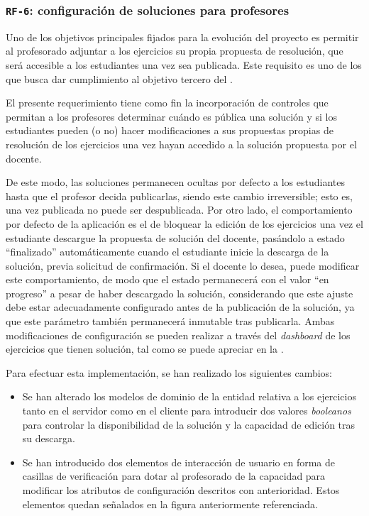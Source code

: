 \subsubsection{\texttt{RF-6}: configuración de soluciones para profesores}
\label{subsec:rf6}

Uno de los objetivos principales fijados para la evolución del proyecto es permitir al profesorado adjuntar a los ejercicios su propia propuesta de resolución, que será accesible a los estudiantes una vez sea publicada. Este requisito es uno de los que busca dar cumplimiento al objetivo tercero del .

El presente requerimiento tiene como fin la incorporación de controles que permitan a los profesores determinar cuándo es pública una solución y si los estudiantes pueden (o no) hacer modificaciones a sus propuestas propias de resolución de los ejercicios una vez hayan accedido a la solución propuesta por el docente.

De este modo, las soluciones permanecen ocultas por defecto a los estudiantes hasta que el profesor decida publicarlas, siendo este cambio irreversible; esto es, una vez publicada no puede ser despublicada. Por otro lado, el comportamiento por defecto de la aplicación es el de bloquear la edición de los ejercicios una vez el estudiante descargue la propuesta de solución del docente, pasándolo a estado ``finalizado'' automáticamente cuando el estudiante inicie la descarga de la solución, previa solicitud de confirmación. Si el docente lo desea, puede modificar este comportamiento, de modo que el estado permanecerá con el valor ``en progreso'' a pesar de haber descargado la solución, considerando que este ajuste debe estar adecuadamente configurado antes de la publicación de la solución, ya que este parámetro también permanecerá inmutable tras publicarla. Ambas modificaciones de configuración se pueden realizar a través del \textit{dashboard} de los ejercicios que tienen solución, tal como se puede apreciar en la .

Para efectuar esta implementación, se han realizado los siguientes cambios:
\begin{itemize}
    \item Se han alterado los modelos de dominio de la entidad relativa a los ejercicios tanto en el servidor como en el cliente para introducir dos valores \textit{booleanos} para controlar la disponibilidad de la solución y la capacidad de edición tras su descarga.
    \item Se han introducido dos elementos de interacción de usuario en forma de casillas de verificación para dotar al profesorado de la capacidad para modificar los atributos de configuración descritos con anterioridad. Estos elementos quedan señalados en la figura anteriormente referenciada.
\end{itemize}

